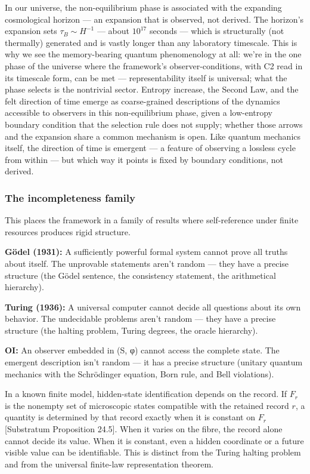 \documentclass[
]{article}
\begin{document}
In our universe, the non-equilibrium phase is associated with the
expanding cosmological horizon --- an expansion that is observed, not
derived. The horizon's expansion sets \(\tau_B \sim H^{-1}\) --- about
\(10^{17}\) seconds --- which is structurally (not thermally) generated
and is vastly longer than any laboratory timescale. This is why we see
the memory-bearing quantum phenomenology at all: we're in the one phase
of the universe where the framework's observer-conditions, with C2 read
in its timescale form, can be met --- representability itself is
universal; what the phase selects is the nontrivial sector. Entropy
increase, the Second Law, and the felt direction of time emerge as
coarse-grained descriptions of the dynamics accessible to observers in
this non-equilibrium phase, given a low-entropy boundary condition that
the selection rule does not supply; whether those arrows and the
expansion share a common mechanism is open. Like quantum mechanics
itself, the direction of time is emergent --- a feature of observing a
lossless cycle from within --- but which way it points is fixed by
boundary conditions, not derived.

\hypertarget{the-incompleteness-family}{%
\subsubsection{The incompleteness
family}\label{the-incompleteness-family}}

This places the framework in a family of results where self-reference
under finite resources produces rigid structure.

\textbf{Gödel (1931):} A sufficiently powerful formal system cannot
prove all truths about itself. The unprovable statements aren't random
--- they have a precise structure (the Gödel sentence, the consistency
statement, the arithmetical hierarchy).

\textbf{Turing (1936):} A universal computer cannot decide all questions
about its own behavior. The undecidable problems aren't random --- they
have a precise structure (the halting problem, Turing degrees, the
oracle hierarchy).

\textbf{OI:} An observer embedded in (S, φ) cannot access the complete
state. The emergent description isn't random --- it has a precise
structure (unitary quantum mechanics with the Schrödinger equation, Born
rule, and Bell violations).

In a known finite model, hidden-state identification depends on the
record. If \(F_r\) is the nonempty set of microscopic states compatible
with the retained record \(r\), a quantity is determined by that record
exactly when it is constant on \(F_r\) {[}Substratum Proposition
24.5{]}. When it varies on the fibre, the record alone cannot decide its
value. When it is constant, even a hidden coordinate or a future visible
value can be identifiable. This is distinct from the Turing halting
problem and from the universal finite-law representation theorem.
\end{document}
